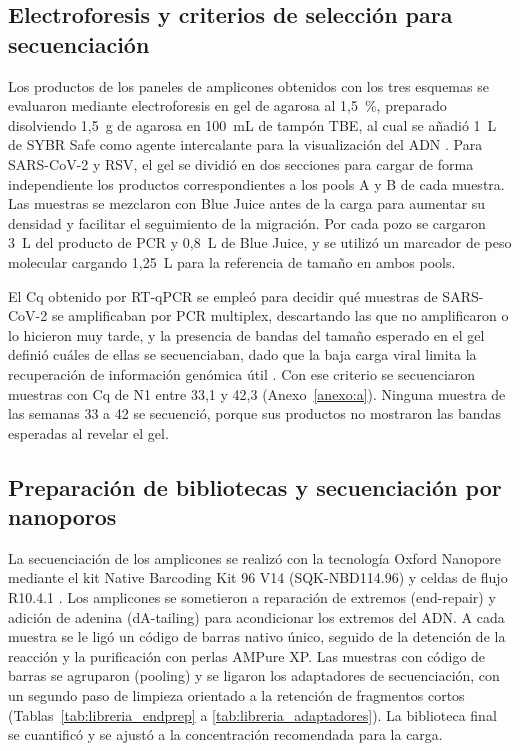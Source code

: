 \subsection{Electroforesis y criterios de selección para secuenciación}

Los productos de los paneles de amplicones obtenidos con los tres esquemas se evaluaron mediante electroforesis en gel de agarosa al 1,5~\%, preparado disolviendo 1,5~g de agarosa en 100~mL de tampón TBE, al cual se añadió 1~\textmu L de SYBR Safe como agente intercalante para la visualización del ADN \cite{NEB_2021}. Para SARS-CoV-2 y RSV, el gel se dividió en dos secciones para cargar de forma independiente los productos correspondientes a los pools A y B de cada muestra. Las muestras se mezclaron con Blue Juice antes de la carga para aumentar su densidad y facilitar el seguimiento de la migración. Por cada pozo se cargaron 3~\textmu L del producto de PCR y 0,8~\textmu L de Blue Juice, y se utilizó un marcador de peso molecular cargando 1,25~\textmu L para la referencia de tamaño en ambos pools.

El Cq obtenido por RT-qPCR se empleó para decidir qué muestras de SARS-CoV-2 se amplificaban por PCR multiplex, descartando las que no amplificaron o lo hicieron muy tarde, y la presencia de bandas del tamaño esperado en el gel definió cuáles de ellas se secuenciaban, dado que la baja carga viral limita la recuperación de información genómica útil \cite{Child_2023}. Con ese criterio se secuenciaron muestras con Cq de N1 entre 33,1 y 42,3 (Anexo~\ref{anexo:a}). Ninguna muestra de las semanas 33 a 42 se secuenció, porque sus productos no mostraron las bandas esperadas al revelar el gel.

\subsection{Preparación de bibliotecas y secuenciación por nanoporos}

La secuenciación de los amplicones se realizó con la tecnología Oxford Nanopore mediante el kit Native Barcoding Kit 96 V14 (SQK-NBD114.96) y celdas de flujo R10.4.1 \cite{ONT_2025,MejiaCalle_2024}. Los amplicones se sometieron a reparación de extremos (end-repair) y adición de adenina (dA-tailing) para acondicionar los extremos del ADN. A cada muestra se le ligó un código de barras nativo único, seguido de la detención de la reacción y la purificación con perlas AMPure XP. Las muestras con código de barras se agruparon (pooling) y se ligaron los adaptadores de secuenciación, con un segundo paso de limpieza orientado a la retención de fragmentos cortos (Tablas~\ref{tab:libreria_endprep} a \ref{tab:libreria_adaptadores}). La biblioteca final se cuantificó y se ajustó a la concentración recomendada para la carga.

